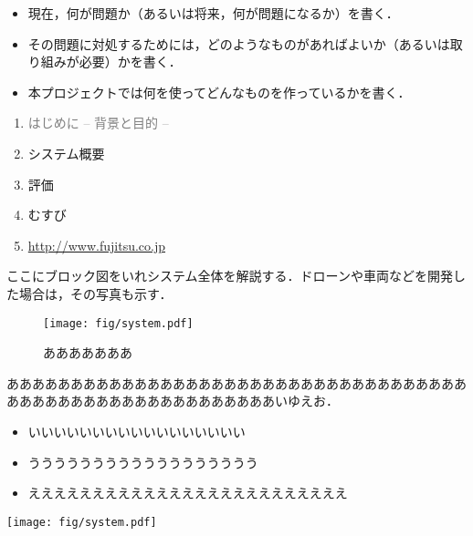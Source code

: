 \maketitle
\thispagestyle{myfirstpage}
\addtocounter{page}{1}
\newpage

\begin{itemize}
 \item 現在，何が問題か（あるいは将来，何が問題になるか）を書く．
 \item その問題に対処するためには，どのようなものがあればよいか（あるいは取り組みが必要）かを書く．
 \item 本プロジェクトでは何を使ってどんなものを作っているかを書く．
\end{itemize}
\newpage

\begin{enumerate}[itemsep=0.25zh]
	\item \textcolor{gray}{はじめに -- 背景と目的 --}
	\item システム概要
	\item 評価
	\item むすび
    \item \url{http://www.fujitsu.co.jp}
\end{enumerate}
\newpage


ここにブロック図をいれシステム全体を解説する．ドローンや車両などを開発した場合は，その写真も示す．
\begin{figure}[h]
\begin{center}
\texttt{[image: fig/system.pdf]}
\caption{あああああああ}
\end{center}
\end{figure}


\newpage

\begin{minipage}[t]{0.4\textwidth}\vspace{0pt}
あああああああああああああああああああああああああああああああああああああああああああああああああああああああああいゆえお．
\begin{itemize}[parsep=-0.5zh]
	\item いいいいいいいいいいいいいいいいい
	\item うううううううううううううううううう
	\item えええええええええええええええええええええええええ
\end{itemize}
\end{minipage}
\begin{minipage}[t]{0.6\textwidth}\vspace{0pt}
\begin{center}
\texttt{[image: fig/system.pdf]}
\end{center}
\end{minipage}

